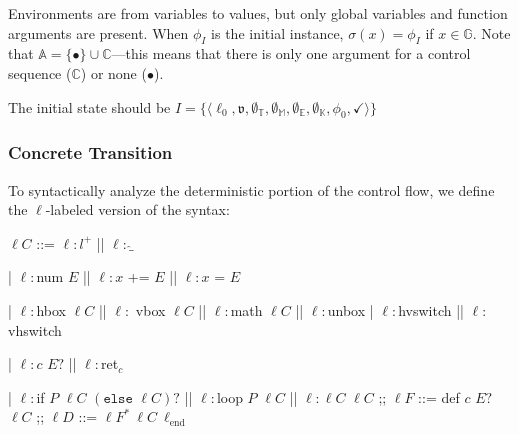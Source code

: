 \documentclass[a4paper]{article}
\newcommand*{\dom}[1]{\mathbb{#1}}
\newcommand*{\state}[8]{\langle #1, #2, #3, #4, #5, #6, #7, #8 \rangle}
\newcommand*{\mode}[1]{\mathfrak{#1}}
\begin{document}
Environments are from variables to values, but only global variables and function arguments are present.
When $\phi_I$ is the initial instance, $\sigma(x) = \phi_I$ if $x \in \mathbb{G}$.
Note that $\dom A = \{\bullet\} \cup \dom C$---this means that there is only one argument for a control sequence ($\dom C$) or none ($\bullet$).

The initial state should be $I = \{\state{\ell_0}{\mode{v}}{\emptyset_{\dom T}}{\emptyset_{\dom M}}{\emptyset_{\dom E}}{\emptyset_{\dom K}}{\phi_0}{\checkmark}\}$

\subsubsection{Concrete Transition}
To syntactically analyze the deterministic portion of the control flow, we define the $\ell$-labeled version of the syntax:
\begin{bnfgrammar}
  $\ell C$ ::=
    $\ell\colon l^+$
  || $\ell\colon \hat\_$

  | $\ell\colon$num $E$
  || $\ell\colon x$ += $E$
  || $\ell\colon x$ = $E$

  | $\ell\colon$hbox $\ell C$ || $\ell\colon$ vbox $\ell C$
  || $\ell\colon$math $\ell C$
  || $\ell\colon$unbox
  | $\ell\colon$hvswitch
  || $\ell\colon$vhswitch

  | $\ell\colon c$ $E?$
  || $\ell\colon$ret$_c$

  | $\ell\colon$if $P$ $\ell C$ $(\texttt{else }\ell C)?$
  || $\ell\colon$loop $P$ $\ell C$
  || $\ell\colon \ell C$ $\ell C$
;;
  $\ell F$ ::=
    def $c$ $E?$ $\ell C$
;;
  $\ell D$ ::=
    $\ell F^*\ \ell C\ \ell_{\textrm{end}}$
\end{bnfgrammar}
\end{document}
